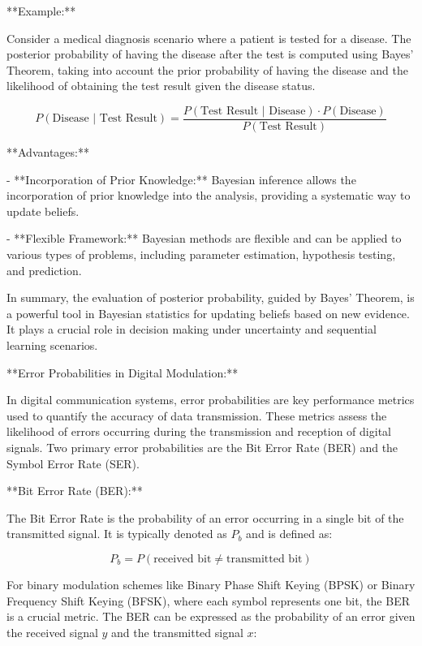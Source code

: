 \documentclass[../../../../DMCC-My-Notebook]{subfiles}
\begin{document}
	**Example:**
	
	Consider a medical diagnosis scenario where a patient is tested for a disease. The posterior probability of having the disease after the test is computed using Bayes' Theorem, taking into account the prior probability of having the disease and the likelihood of obtaining the test result given the disease status.
	
	\[ P(\text{Disease | Test Result}) = \frac{P(\text{Test Result | Disease}) \cdot P(\text{Disease})}{P(\text{Test Result})} \]
	
	**Advantages:**
	
	- **Incorporation of Prior Knowledge:** Bayesian inference allows the incorporation of prior knowledge into the analysis, providing a systematic way to update beliefs.
	
	- **Flexible Framework:** Bayesian methods are flexible and can be applied to various types of problems, including parameter estimation, hypothesis testing, and prediction.
	
	In summary, the evaluation of posterior probability, guided by Bayes' Theorem, is a powerful tool in Bayesian statistics for updating beliefs based on new evidence. It plays a crucial role in decision making under uncertainty and sequential learning scenarios.
	
	
	
	
	
	
	
	**Error Probabilities in Digital Modulation:**
	
	In digital communication systems, error probabilities are key performance metrics used to quantify the accuracy of data transmission. These metrics assess the likelihood of errors occurring during the transmission and reception of digital signals. Two primary error probabilities are the Bit Error Rate (BER) and the Symbol Error Rate (SER).
	
	**Bit Error Rate (BER):**
	
	The Bit Error Rate is the probability of an error occurring in a single bit of the transmitted signal. It is typically denoted as \(P_b\) and is defined as:
	
	\[ P_b = P(\text{received bit} \neq \text{transmitted bit}) \]
	
	For binary modulation schemes like Binary Phase Shift Keying (BPSK) or Binary Frequency Shift Keying (BFSK), where each symbol represents one bit, the BER is a crucial metric. The BER can be expressed as the probability of an error given the received signal \(y\) and the transmitted signal \(x\):
	
\end{document}

